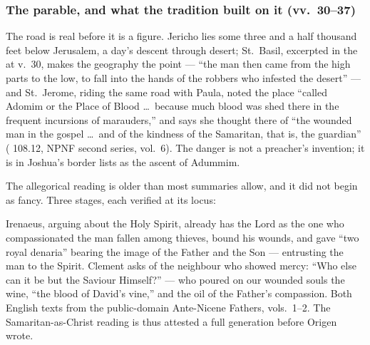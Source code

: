 \subsubsection*{The parable, and what the tradition built on it (vv.~30--37)}

The road is real before it is a figure. Jericho lies some three and a half
thousand feet below Jerusalem, a day's descent through desert; St.\ Basil,
excerpted in the  at v.~30, makes the geography the point
--- ``the man then came from the high parts to the low, to fall into the hands
of the robbers who infested the desert'' --- and St.\ Jerome, riding the same
road with Paula, noted the place ``called Adomim or the Place of Blood \dots\
because much blood was shed there in the frequent incursions of marauders,''
and says she thought there of ``the wounded man in the gospel \dots\ and of
the kindness of the Samaritan, that is, the guardian'' (\work{Epistle} 108.12,
NPNF second series, vol.~6). The danger is not a preacher's invention; it is
in Joshua's border lists as the ascent of Adummim.

The allegorical reading is older than most summaries allow, and it did not
begin as fancy. Three stages, each verified at its locus:

\begin{witnessnote}
Irenaeus, arguing about the Holy Spirit, already has the Lord as the one who
compassionated the man fallen among thieves, bound his wounds, and gave ``two
royal denaria'' bearing the image of the Father and the Son --- entrusting the
man to the Spirit. Clement asks of the neighbour who showed mercy: ``Who else
can it be but the Saviour Himself?'' --- who poured on our wounded souls the
wine, ``the blood of David's vine,'' and the oil of the Father's compassion.
Both English texts from the public-domain Ante-Nicene Fathers, vols.~1--2.
The Samaritan-as-Christ reading is thus attested a full generation before
Origen wrote.
\end{witnessnote}

